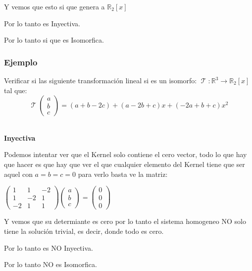 \documentclass[12pt]{report}                                    %
\DeclareMathOperator \LinealTransformation {\mathcal{T}}
\begin{document}
            Y vemos que esto si que genera a $\mathbb{R}_2[x]$

            Por lo tanto es Inyectiva.  

            Por lo tanto si que es Isomorfica.   


            \clearpage
            \subsubsection{Ejemplo}
            Verificar si las siguiente transformación lineal si es un isomorfo:
            $\LinealTransformation : \mathbb{R}^3 \to \mathbb{R}_2[x]$ tal que: 
            \begin{equation*}
                \LinealTransformation(\begin{matrix}a\\b\\c\end{matrix}) = (a+b-2c)+(a-2b+c)x+(-2a+b+c)x^2
            \end{equation*}

            \textbf{\\Inyectiva}

            Podemos intentar ver que el Kernel solo contiene el cero vector, todo lo que hay que hacer es
            que hay que ver el que cualquier elemento del Kernel tiene que ser aquel con $a=b=c=0$
            para verlo basta ve la matriz:

            $\begin{pmatrix}1&1&-2\\1&-2&1\\-2&1&1\end{pmatrix} \begin{pmatrix}a\\b\\c\end{pmatrix}=
                \begin{pmatrix}0\\0\\0\end{pmatrix}$

            Y vemos que su determiante es cero por lo tanto el sistema homogeneo NO solo
            tiene la solución trivial, es decir, donde todo es cero.

            Por lo tanto es NO Inyectiva.

            Por lo tanto NO es Isomorfica.
\end{document}
